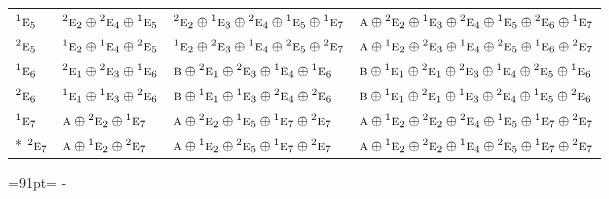 \documentclass[10pt,a4paper]{article}
\newcommand{\needspace}[1]{\par\penalty-100\begingroup\dimen0=#1\relax\dimen2=\pagegoal
  \advance\dimen2-\pagetotal\ifdim\dimen0>\dimen2\relax\ifdim\dimen2>0pt\vfil\break\fi\fi
  \endgroup}
\numberwithin{equation}{section}
\newcommand{\irr}[1]{\text{\normalfont\scshape #1}}
\newcommand{\conjpair}[1]{{}^{#1}}
\begin{document}
{\begin{longtable}{@{}llll@{}}
$\conjpair{1}\irr{e}_{5}$ & $\conjpair{2}\irr{e}_{2}\oplus \conjpair{2}\irr{e}_{4}\oplus \conjpair{1}\irr{e}_{5}$ & $\conjpair{2}\irr{e}_{2}\oplus \conjpair{1}\irr{e}_{3}\oplus \conjpair{2}\irr{e}_{4}\oplus \conjpair{1}\irr{e}_{5}\oplus \conjpair{1}\irr{e}_{7}$ & $\irr{a}\oplus \conjpair{2}\irr{e}_{2}\oplus \conjpair{1}\irr{e}_{3}\oplus \conjpair{2}\irr{e}_{4}\oplus \conjpair{1}\irr{e}_{5}\oplus \conjpair{2}\irr{e}_{6}\oplus \conjpair{1}\irr{e}_{7}$\\
$\conjpair{2}\irr{e}_{5}$ & $\conjpair{1}\irr{e}_{2}\oplus \conjpair{1}\irr{e}_{4}\oplus \conjpair{2}\irr{e}_{5}$ & $\conjpair{1}\irr{e}_{2}\oplus \conjpair{2}\irr{e}_{3}\oplus \conjpair{1}\irr{e}_{4}\oplus \conjpair{2}\irr{e}_{5}\oplus \conjpair{2}\irr{e}_{7}$ & $\irr{a}\oplus \conjpair{1}\irr{e}_{2}\oplus \conjpair{2}\irr{e}_{3}\oplus \conjpair{1}\irr{e}_{4}\oplus \conjpair{2}\irr{e}_{5}\oplus \conjpair{1}\irr{e}_{6}\oplus \conjpair{2}\irr{e}_{7}$\\
$\conjpair{1}\irr{e}_{6}$ & $\conjpair{2}\irr{e}_{1}\oplus \conjpair{2}\irr{e}_{3}\oplus \conjpair{1}\irr{e}_{6}$ & $\irr{b}\oplus \conjpair{2}\irr{e}_{1}\oplus \conjpair{2}\irr{e}_{3}\oplus \conjpair{1}\irr{e}_{4}\oplus \conjpair{1}\irr{e}_{6}$ & $\irr{b}\oplus \conjpair{1}\irr{e}_{1}\oplus \conjpair{2}\irr{e}_{1}\oplus \conjpair{2}\irr{e}_{3}\oplus \conjpair{1}\irr{e}_{4}\oplus \conjpair{2}\irr{e}_{5}\oplus \conjpair{1}\irr{e}_{6}$\\
$\conjpair{2}\irr{e}_{6}$ & $\conjpair{1}\irr{e}_{1}\oplus \conjpair{1}\irr{e}_{3}\oplus \conjpair{2}\irr{e}_{6}$ & $\irr{b}\oplus \conjpair{1}\irr{e}_{1}\oplus \conjpair{1}\irr{e}_{3}\oplus \conjpair{2}\irr{e}_{4}\oplus \conjpair{2}\irr{e}_{6}$ & $\irr{b}\oplus \conjpair{1}\irr{e}_{1}\oplus \conjpair{2}\irr{e}_{1}\oplus \conjpair{1}\irr{e}_{3}\oplus \conjpair{2}\irr{e}_{4}\oplus \conjpair{1}\irr{e}_{5}\oplus \conjpair{2}\irr{e}_{6}$\\
$\conjpair{1}\irr{e}_{7}$ & $\irr{a}\oplus \conjpair{2}\irr{e}_{2}\oplus \conjpair{1}\irr{e}_{7}$ & $\irr{a}\oplus \conjpair{2}\irr{e}_{2}\oplus \conjpair{1}\irr{e}_{5}\oplus \conjpair{1}\irr{e}_{7}\oplus \conjpair{2}\irr{e}_{7}$ & $\irr{a}\oplus \conjpair{1}\irr{e}_{2}\oplus \conjpair{2}\irr{e}_{2}\oplus \conjpair{2}\irr{e}_{4}\oplus \conjpair{1}\irr{e}_{5}\oplus \conjpair{1}\irr{e}_{7}\oplus \conjpair{2}\irr{e}_{7}$\\*
$\conjpair{2}\irr{e}_{7}$ & $\irr{a}\oplus \conjpair{1}\irr{e}_{2}\oplus \conjpair{2}\irr{e}_{7}$ & $\irr{a}\oplus \conjpair{1}\irr{e}_{2}\oplus \conjpair{2}\irr{e}_{5}\oplus \conjpair{1}\irr{e}_{7}\oplus \conjpair{2}\irr{e}_{7}$ & $\irr{a}\oplus \conjpair{1}\irr{e}_{2}\oplus \conjpair{2}\irr{e}_{2}\oplus \conjpair{1}\irr{e}_{4}\oplus \conjpair{2}\irr{e}_{5}\oplus \conjpair{1}\irr{e}_{7}\oplus \conjpair{2}\irr{e}_{7}$\\
\bottomrule\end{longtable}}
\needspace{91pt}
\end{document}
